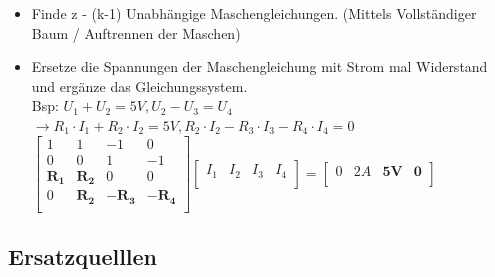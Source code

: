 \begin{center}
\begin{itemize}
					                \item Finde z - (k-1) Unabhängige Maschengleichungen. (Mittels Vollständiger Baum / Auftrennen der Maschen)
					                \item Ersetze die Spannungen der Maschengleichung mit Strom mal Widerstand und ergänze das Gleichungssystem.
					                \\ Bsp:
					                $U_1 + U_2 = 5V, U_2 - U_3 = U_4$ \\ $ \rightarrow R_1 \cdot I_1 + R_2 \cdot I_2 = 5V, R_2 \cdot I_2 - R_3 \cdot I_3 - R_4 \cdot I_4 = 0$ \\
					                $
					 \left[ {\begin{array}{cccc}
					    1 & 1 & -1 & 0 \\
					    0 & 0 & 1 & -1 \\
					    \mathbf{R_1} & \mathbf{R_2} & 0 & 0 \\
					    0 & \mathbf{R_2} & \mathbf{-R_3} & \mathbf{-R_4} \\
					\end{array} } \right] \left[ {\begin{array}{c} I_1 & I_2 & I_3 & I_4 \\ \end{array} } \right] =   \left[ {\begin{array}{c}  0 & 2A & \mathbf{5V} & \mathbf{0} \\ \end{array} } \right] $ \\

					              \end{itemize}
					            \end{center}
					            \iend






										\subsection{Ersatzquelllen}


